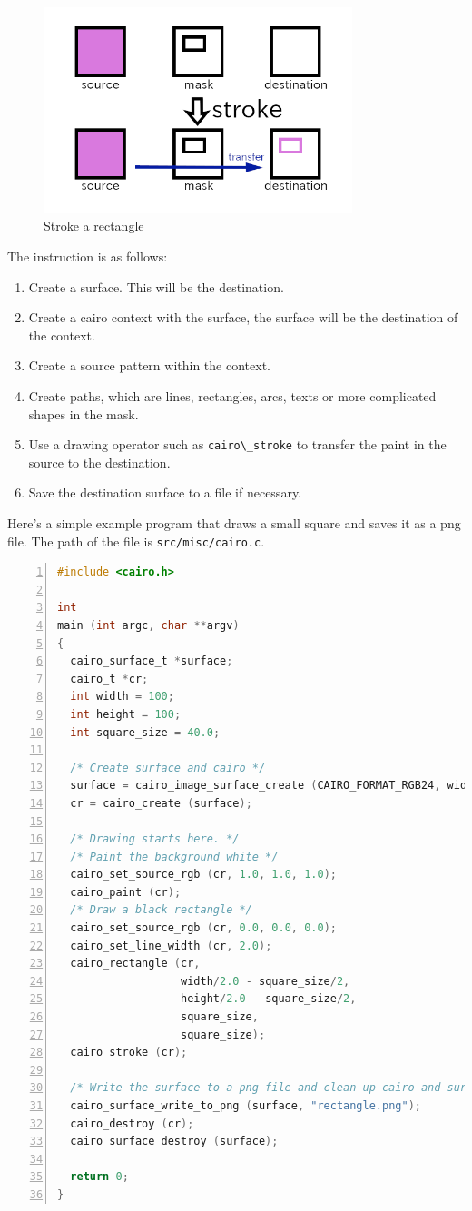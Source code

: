\begin{figure}
\centering
\includegraphics[width=9cm,height=6cm]{../image/cairo.png}
\caption{Stroke a rectangle}
\end{figure}

The instruction is as follows:

\begin{enumerate}
\def\labelenumi{\arabic{enumi}.}
\tightlist
\item
  Create a surface. This will be the destination.
\item
  Create a cairo context with the surface, the surface will be the
  destination of the context.
\item
  Create a source pattern within the context.
\item
  Create paths, which are lines, rectangles, arcs, texts or more
  complicated shapes in the mask.
\item
  Use a drawing operator such as \passthrough{\lstinline!cairo\_stroke!}
  to transfer the paint in the source to the destination.
\item
  Save the destination surface to a file if necessary.
\end{enumerate}

Here's a simple example program that draws a small square and saves it
as a png file. The path of the file is
\passthrough{\lstinline!src/misc/cairo.c!}.

\begin{lstlisting}[language=C, numbers=left]
#include <cairo.h>

int
main (int argc, char **argv)
{
  cairo_surface_t *surface;
  cairo_t *cr;
  int width = 100;
  int height = 100;
  int square_size = 40.0;

  /* Create surface and cairo */
  surface = cairo_image_surface_create (CAIRO_FORMAT_RGB24, width, height);
  cr = cairo_create (surface);

  /* Drawing starts here. */
  /* Paint the background white */
  cairo_set_source_rgb (cr, 1.0, 1.0, 1.0);
  cairo_paint (cr);
  /* Draw a black rectangle */
  cairo_set_source_rgb (cr, 0.0, 0.0, 0.0);
  cairo_set_line_width (cr, 2.0);
  cairo_rectangle (cr,
                   width/2.0 - square_size/2,
                   height/2.0 - square_size/2,
                   square_size,
                   square_size);
  cairo_stroke (cr);

  /* Write the surface to a png file and clean up cairo and surface. */
  cairo_surface_write_to_png (surface, "rectangle.png");
  cairo_destroy (cr);
  cairo_surface_destroy (surface);

  return 0;
}
\end{lstlisting}

